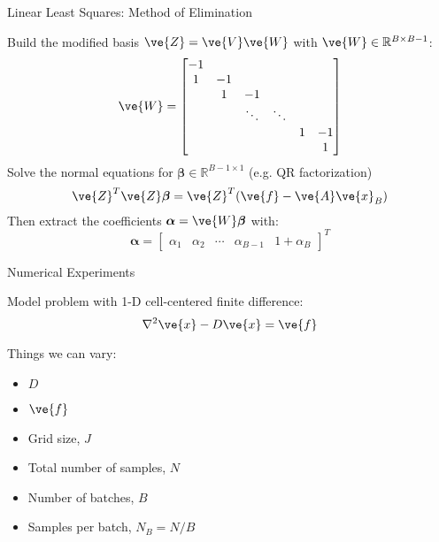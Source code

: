 \documentclass{beamer}
\begin{document}
\begin{frame}{Linear Least Squares: Method of Elimination}

  Build the modified basis $\ve{Z} = \ve{V}\ve{W}$ with $\ve{W} \in
  \mathbb{R}^{B \times B-1}$:
  \[
  \ve{W} =
  \begin{bmatrix}
    -1 &    & & & & \\
     1 & -1 & & & & \\
       &  1 & -1 & & & \\
       &    & \ddots   & \ddots &  & \\
     & & & & 1 & -1 \\
    & & & & & 1 \\
  \end{bmatrix}
  \]
  Solve the normal equations for $\boldsymbol{\beta} \in
  \mathbb{R}^{B-1 \times 1}$ (e.g. QR factorization)
  \[
  \ve{Z}^T \ve{Z} \boldsymbol{\beta} = \ve{Z}^T ( \ve{f} - \ve{A}\ve{x}_B
  )
  \]
  Then extract the coefficients $\boldsymbol{\alpha} =
  \ve{W}\boldsymbol{\beta}$ with:
  \[
  \boldsymbol{\alpha} =
  \begin{bmatrix}
    \alpha_1 & \alpha_2 & \cdots & \alpha_{B-1} & 1 + \alpha_{B}
  \end{bmatrix}^T
  \]

\end{frame}

\begin{frame}{Numerical Experiments}

  Model problem with 1-D cell-centered finite difference:
  \[
  \nabla^2 \ve{x} - D \ve{x} = \ve{f}
  \]

  Things we can vary:
  \begin{itemize}
    \item $D$
    \item $\ve{f}$
    \item Grid size, $J$
    \item Total number of samples, $N$
    \item Number of batches, $B$
    \item Samples per batch, $N_B = N/B$
  \end{itemize}
  
\end{frame}

\end{document}
